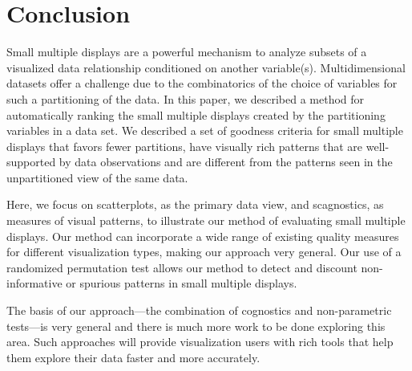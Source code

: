 \section{Conclusion}

Small multiple displays are a powerful mechanism to analyze subsets of a visualized data relationship conditioned on another variable(s). Multidimensional datasets offer a challenge due to the combinatorics of the choice of variables for such a partitioning of the data. In this paper, we described a method for automatically ranking the small multiple displays created by the partitioning variables in a data set. We described a set of goodness criteria for small multiple displays that favors fewer partitions, have visually rich patterns that are well-supported by data observations and are different from the patterns seen in the unpartitioned view of the same data.

Here, we focus on scatterplots, as the primary data view, and scagnostics, as measures of visual patterns, to illustrate our method of evaluating small multiple displays. Our method can incorporate a wide range of existing quality measures for different visualization types, making our approach very general. Our use of a randomized permutation test allows our method to detect and discount non-informative or spurious patterns in small multiple displays.

The basis of our approach---the combination of cognostics and non-parametric tests---is very general and there is much more work to be done exploring this area. Such approaches will provide visualization users with rich tools that help them explore their data faster and more accurately.
